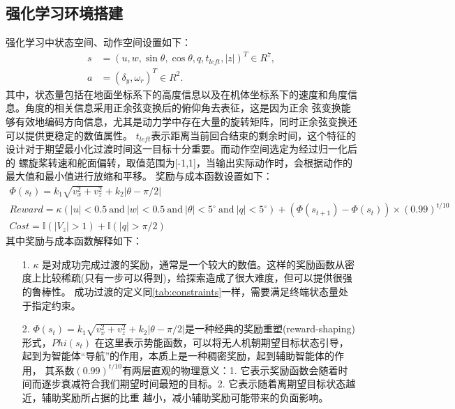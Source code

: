 \subsection{强化学习环境搭建}
强化学习中状态空间、动作空间设置如下：
\begin{equation}
    \begin{aligned}
    s &= \left(u,w,\sin \theta , \cos \theta , q, t_{left},\left | z \right | \right)^{T} \in R^{7}, \\
    a &= \left(\delta_{y},\omega_{r}\right)^{T} \in R^{2}.
    \end{aligned}
\end{equation}
其中，状态量包括在地面坐标系下的高度信息以及在机体坐标系下的速度和角度信息。角度的相关信息采用正余弦变换后的俯仰角去表征，这是因为正余
弦变换能够有效地编码方向信息，尤其是动力学中存在大量的旋转矩阵，同时正余弦变换还可以提供更稳定的数值属性。
$t_{left}$表示距离当前回合结束的剩余时间，这个特征的设计对于期望最小化过渡时间这一目标十分重要\cite{pardo2018time}。而动作空间选定为经过归一化后的
螺旋桨转速和舵面偏转，取值范围为[-1,1]，当输出实际动作时，会根据动作的最大值和最小值进行放缩和平移。
奖励与成本函数设置如下：
\begin{gather}
    \Phi (s_{t})=k_{1}\sqrt{v_{x}^{2}+v_{z}^{2}}+k_{2}\left | \theta-\pi/2 \right | \\
    Reward=\kappa(\left | u \right | < 0.5 \ \text{and}\ \left | w \right | < 0.5\ \text{and}\ \left | \theta \right | < 5^{\circ}\ \text{and}\ \left | q \right | < 5^{\circ})+(\Phi (s_{t+1})-\Phi (s_{t}))\times (0.99)^{t/10}\\
    Cost=\mathbb I(\left | V_{z} \right |> 1 ) + \mathbb I(\left | q \right |> \pi/2  )  
\end{gather}
其中奖励与成本函数解释如下：
\begin{itemize}
    \item [1.] $\kappa$ 是对成功完成过渡的奖励，通常是一个较大的数值。这样的奖励函数从密度上比较稀疏(只有一步可以得到)，给探索造成了很大难度，但可以提供很强的鲁棒性。
    成功过渡的定义同\autoref{tab:constraints}一样，需要满足终端状态量处于指定约束。
    \item [2.] $\Phi (s_{t})=k_{1}\sqrt{v_{x}^{2}+v_{z}^{2}}+k_{2}\left | \theta-\pi/2 \right |$是一种经典的奖励重塑(reward-shaping)形式，$Phi (s_{t})$
    在这里表示势能函数，可以将无人机朝期望目标状态引导，起到为智能体“导航”的作用，本质上是一种稠密奖励，起到辅助智能体的作用，
    其系数$(0.99)^{t/10}$有两层直观的物理意义：1. 它表示奖励函数会随着时间而逐步衰减符合我们期望时间最短的目标。2. 它表示随着离期望目标状态越近，辅助奖励所占据的比重
    越小，减小辅助奖励可能带来的负面影响。
\end{itemize}
